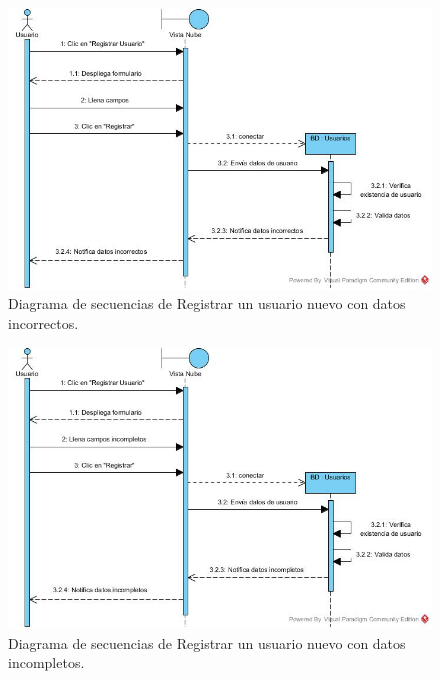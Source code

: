 \begin{figure}[htbp!]
		\centering
			\includegraphics[width=1\textwidth]{images/Registrar_trayectoria_a}
		\caption{Diagrama de secuencias de Registrar un usuario nuevo con datos incorrectos.}
\end{figure}

\begin{figure}[htbp!]
		\centering
			\includegraphics[width=1\textwidth]{images/Registrar_trayectoria_b}
		\caption{Diagrama de secuencias de Registrar un usuario nuevo con datos incompletos.}
\end{figure}

